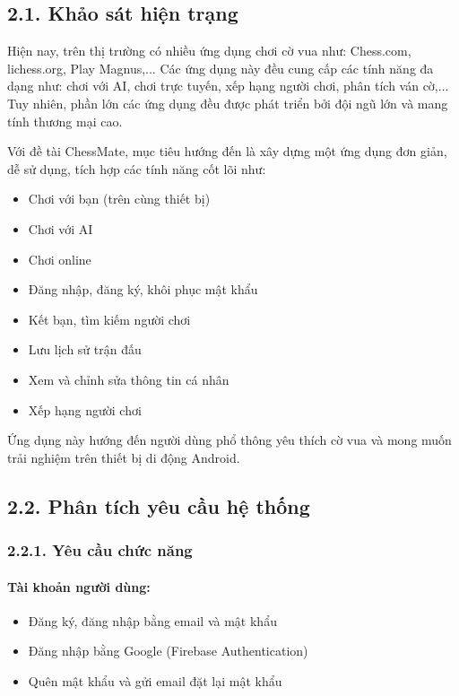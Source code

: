 \documentclass[a4paper,12pt]{article}
\begin{document}
\subsection*{2.1. Khảo sát hiện trạng} %

\justify
\noindent Hiện nay, trên thị trường có nhiều ứng dụng chơi cờ vua như: Chess.com, lichess.org, Play Magnus,... Các ứng dụng này đều cung cấp các tính năng đa dạng như: chơi với AI, chơi trực tuyến, xếp hạng người chơi, phân tích ván cờ,... Tuy nhiên, phần lớn các ứng dụng đều được phát triển bởi đội ngũ lớn và mang tính thương mại cao.

\noindent Với đề tài ChessMate, mục tiêu hướng đến là xây dựng một ứng dụng đơn giản, dễ sử dụng, tích hợp các tính năng cốt lõi như:
\begin{itemize}[label=·]
    \item Chơi với bạn (trên cùng thiết bị)
    \item Chơi với AI
    \item Chơi online
    \item Đăng nhập, đăng ký, khôi phục mật khẩu
    \item Kết bạn, tìm kiếm người chơi
    \item Lưu lịch sử trận đấu
    \item Xem và chỉnh sửa thông tin cá nhân
    \item Xếp hạng người chơi
\end{itemize}
\noindent Ứng dụng này hướng đến người dùng phổ thông yêu thích cờ vua và mong muốn trải nghiệm trên thiết bị di động Android.

\subsection*{2.2. Phân tích yêu cầu hệ thống} %
\subsubsection*{2.2.1. Yêu cầu chức năng} %

\paragraph{Tài khoản người dùng:} %
\begin{itemize}[label=·]
    \item Đăng ký, đăng nhập bằng email và mật khẩu
    \item Đăng nhập bằng Google (Firebase Authentication)
    \item Quên mật khẩu và gửi email đặt lại mật khẩu
\end{itemize}
\end{document}
